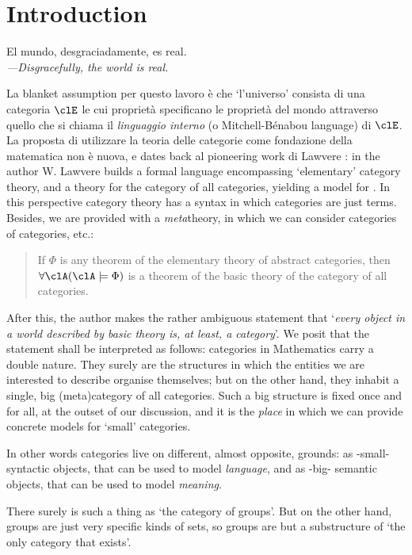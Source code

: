 \section{Introduction}\label{sec_intro}
\epigraph{El mundo, desgraciadamente, es real.\\[2mm]
\footnotesize\emph{---Disgracefully, the world is real.}
}{\cite{confutacion}}
La blanket assumption per questo lavoro è che `l'universo' consista di una categoria $\clE$ le cui proprietà specificano le proprietà del mondo attraverso quello che si chiama il \emph{linguaggio interno} (o Mitchell-Bénabou language) di $\clE$. La proposta di utilizzare la teoria delle categorie come fondazione della matematica non è nuova, e dates back al pioneering work di Lawvere \cite{lawvere1964elementary,lajolla,lawvere1969adjointness,lawvere1963functorial}: in  \cite{lajolla} the author W. Lawvere builds a formal language  encompassing `elementary' category theory, and a theory  for the category of all categories, yielding a model for . In this perspective category theory has a syntax in which categories are just terms. Besides, we are provided with a \emph{meta}theory, in which we can consider categories of categories, etc.:
\begin{quote}
	If $\Phi$ is any theorem of the elementary theory of abstract categories, then $\forall \clA (\clA \models \Phi)$ is a theorem of the basic theory of the category of all categories. \hfill \cite{lajolla}
\end{quote}
After this, the author makes the rather ambiguous statement that `\textit{every object in a world described by basic theory is, at least, a category}'. We posit that the statement shall be interpreted as follows: categories in Mathematics carry a double nature. They surely are the structures in which the entities we are interested to describe organise themselves; but on the other hand, they inhabit a single, big (meta)category of all categories. Such a big structure is fixed once and for all, at the outset of our discussion, and it is the \emph{place} in which we can provide concrete models for `small' categories.

In other words categories live on different, almost opposite, grounds: as -small- syntactic objects, that can be used to model \emph{language}, and as -big- semantic objects, that can be used to model \emph{meaning}.

There surely is such a thing as `the category of groups'. But on the other hand, groups are just very specific kinds of sets, so groups are but a substructure of `the only category that exists'.

